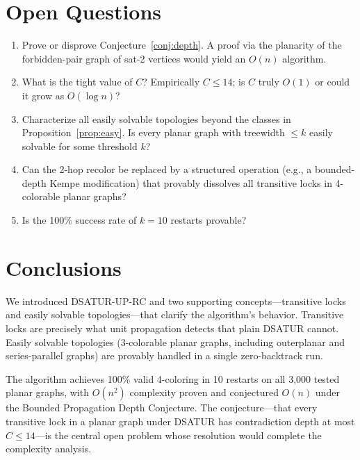 \documentclass[11pt,twocolumn]{article}
\begin{document}
\section{Open Questions}
\label{sec:open}

\begin{enumerate}[label=\textbf{Q\arabic*.},noitemsep]
  \item Prove or disprove Conjecture~\ref{conj:depth}.  A proof via
        the planarity of the forbidden-pair graph of sat-2 vertices would
        yield an $O(n)$ algorithm.
  \item What is the tight value of $C$?  Empirically $C\leq 14$;
        is $C$ truly $O(1)$ or could it grow as $O(\log n)$?
  \item Characterize all easily solvable topologies beyond the classes
        in Proposition~\ref{prop:easy}.  Is every planar graph with
        treewidth $\leq k$ easily solvable for some threshold $k$?
  \item Can the 2-hop recolor be replaced by a structured operation
        (e.g., a bounded-depth Kempe modification) that provably dissolves
        all transitive locks in 4-colorable planar graphs?
  \item Is the 100\% success rate of $k=10$ restarts provable?
\end{enumerate}

\section{Conclusions}

We introduced DSATUR-UP-RC and two supporting concepts---transitive locks
and easily solvable topologies---that clarify the algorithm's behavior.
Transitive locks are precisely what unit propagation detects that plain
DSATUR cannot.  Easily solvable topologies (3-colorable planar graphs,
including outerplanar and series-parallel graphs) are provably handled in
a single zero-backtrack run.

The algorithm achieves 100\% valid 4-coloring in 10 restarts on all
3{,}000 tested planar graphs, with $O(n^2)$ complexity proven and
conjectured $O(n)$ under the Bounded Propagation Depth Conjecture.
The conjecture---that every transitive lock in a planar graph under DSATUR
has contradiction depth at most $C\leq 14$---is the central open problem
whose resolution would complete the complexity analysis.
\end{document}
